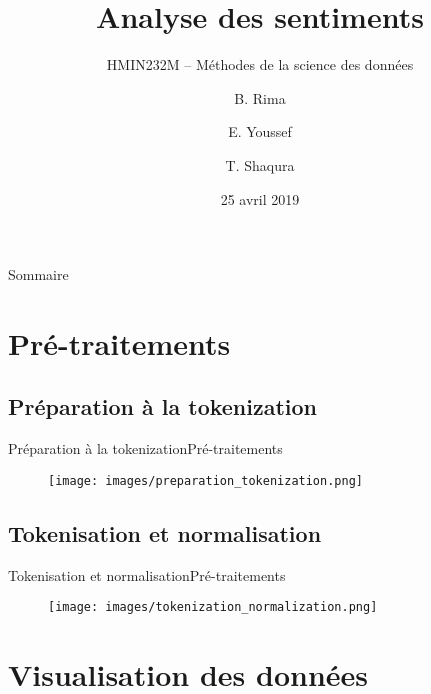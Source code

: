 \documentclass[usenames,dvipsnames]{beamer}
\title{Analyse des sentiments}
\subtitle{HMIN232M -- Méthodes de la science des données}
\author{B. Rima \and E. Youssef \and T. Shaqura}
\institute[UM]{M1 Informatique AIGLE}
\date{25 avril 2019}
\begin{document}
\begin{frame}
\titlepage
\end{frame}
\begin{frame}{Sommaire}
\tableofcontents
\end{frame}
\section{Pré-traitements}
\subsection{Préparation à la tokenization}
\begin{frame}{Préparation à la tokenization}{Pré-traitements}
\begin{figure}[!ht]
  \centering
  \texttt{[image: images/preparation\_tokenization.png]}
\end{figure}
\end{frame}

\subsection{Tokenisation et normalisation}
\begin{frame}{Tokenisation et normalisation}{Pré-traitements}
\begin{figure}[!ht]
  \centering
  \texttt{[image: images/tokenization\_normalization.png]}
\end{figure}
\end{frame}

\section{Visualisation des données}
\end{document}
